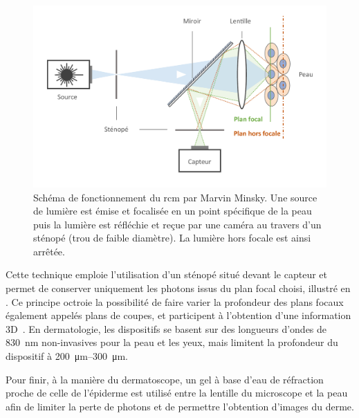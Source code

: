 \addtocounter{footnote}{1}

\begin{figure}[H]
\centering
    \includegraphics[width=\linewidth]{contents/chapter_2/resources/scheme_principle_rcm.pdf}
    \caption{Schéma de fonctionnement du \gls{rcm} par Marvin Minsky. Une source de lumière est émise et focalisée en un point spécifique de la peau puis la lumière est réfléchie et reçue par une caméra au travers d'un sténopé (trou de faible diamètre). La lumière hors focale est ainsi arrêtée.}
    \label{fig:scheme_principle_rcm}
\end{figure}\par

Cette technique emploie l’utilisation d’un sténopé situé devant le capteur et permet de conserver uniquement les photons issus du plan focal choisi, illustré en . Ce principe octroie la possibilité de faire varier la profondeur des plans focaux également appelés plans de coupes, et participent à l’obtention d’une information 3D~\cite{Sheppard2019}. En dermatologie, les dispositifs se basent sur des longueurs d’ondes de \SI{830}{\nano\metre} non-invasives pour la peau et les yeux, mais limitent la profondeur du dispositif à \SIrange{200}{300}{\micro\metre}.\par

Pour finir, à la manière du dermatoscope, un gel à base d’eau de réfraction proche de celle de l’épiderme est utilisé entre la lentille du microscope et la peau afin de limiter la perte de photons et de permettre l’obtention d’images du derme.\par

